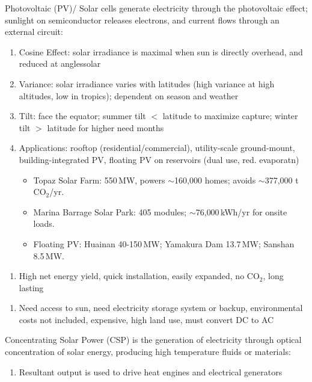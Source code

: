 \documentclass[12pt, a4paper]{article}
\begin{document}
\begin{multicols*}{3}
Photovoltaic (PV)/ Solar cells generate electricity through the photovoltaic effect; sunlight on semiconductor releases electrons, and current flows through an external circuit:
\begin{enumerate}[\roman*.]
  \item Cosine Effect: solar irradiance is maximal when sun is directly overhead, and reduced at anglessolar 
  \item Variance: solar irradiance varies with latitudes (high variance at high altitudes, low in tropics); dependent on season and weather
  \item Tilt: face the equator; summer tilt $<$ latitude to maximize capture; winter tilt $>$ latitude for higher need months
  \item Applications: rooftop (residential/commercial), utility-scale ground-mount, building-integrated PV, floating PV on reservoirs (dual use, red. evaporatn)
    \begin{itemize}[leftmargin=*]\vspace{2pt}
      \item {Topaz Solar Farm}: 550\,MW, powers $\sim$160{,}000 homes; avoids $\sim$377{,}000 t\,CO$_2$/yr.
      \item {Marina Barrage Solar Park}: 405 modules; $\sim$76{,}000\,kWh/yr for onsite loads. 
      \item {Floating PV}: Huainan 40-150\,MW; Yamakura Dam 13.7\,MW; Sanshan 8.5\,MW.
    \end{itemize}
\end{enumerate}\vspace{-1pt}
\begin{enumerate}[$+$]
  \item High net energy yield, quick installation, easily expanded, no CO$_2$, long lasting
\end{enumerate}\vspace{-1pt}
\begin{enumerate}[$-$]
  \item Need access to sun, need electricity storage system or backup, environmental costs not included, expensive, high land use, must convert DC to AC
\end{enumerate}
\vspace{-1em}
\colbreak
Concentrating Solar Power (CSP) is the generation of electricity through optical concentration of solar energy, producing high temperature fluids or materials:
\begin{enumerate}[\roman*.]
  \item Resultant output is used to drive heat engines and electrical generators 
\end{enumerate}


\end{multicols*}
\end{document}
